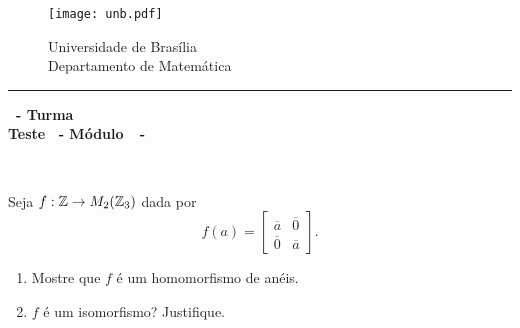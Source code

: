 \documentclass[12pt]{exam}
\begin{document}
    \begin{figure}[h]
        \begin{minipage}[c]{1.7cm}
            \texttt{[image: unb.pdf]}
        \end{minipage}
        \hspace{0pt}
        \begin{minipage}[c]{4in}
            {Universidade de Brasília} \\
            {Departamento de Matemática}
        \end{minipage}
    \end{figure}
    \hrule
    \begin{center}
        {\Large\bf \disciplina\ - Turma \turma}  \\
         {\large\bf Teste \numeroteste\ - Módulo\ \modulo\ -\ \dataavaliacao}
    \end{center}

    \\
    \vspace*{.01cm}


    \vspace{.4cm}


    \questao Seja $f : \mathbb{Z} \to M_2(\mathbb{Z}_3)$ dada por
    \[
        f(a) = \begin{bmatrix}
            \overline{a} & \overline{0}\\
            \overline{0} & \overline{a}
        \end{bmatrix}.
    \]
    \begin{enumerate}[label=({\alph*})]
        \item Mostre que $f$ é um homomorfismo de anéis.

        \item $f$ é um isomorfismo? Justifique.
    \end{enumerate}
\end{document}
